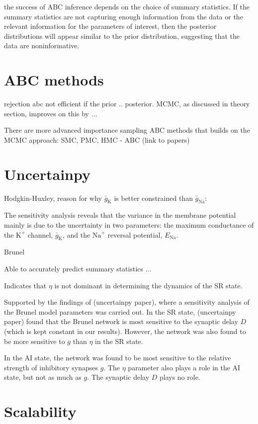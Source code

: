 the success of ABC inference depends on the choice of summary statistics. If the summary statistics are not capturing enough information from the data or the relevant information for the parameters of interest, then the posterior distributions will appear similar to the prior distribution, suggesting that the data are noninformative. 

\section{ABC methods}

rejection abc not efficient if the prior .. posterior. MCMC, as discussed in theory section, improves on this by ... 

There are more advanced importance sampling ABC methods that builds on the MCMC approach: SMC, PMC, HMC - ABC (link to papers)


\section{Uncertainpy}

Hodgkin-Huxley, reason for why $\bar{g}_\mathrm{K}$ is better constrained than $\bar{g}_\mathrm{Na}$:

The sensitivity analysis reveals that the variance in the membrane potential mainly is due to the uncertainty in two parameters: the maximum conductance of the $\mathrm{K}^+$ channel, $\bar{g}_\mathrm{K}$, and the $\mathrm{Na}^+$ reversal potential, $E_\mathrm{Na}$.

Brunel 

Able to accurately predict summary statistics ...

Indicates that $\eta$ is not dominant in determining the dynamics of the SR state. 

Supported by the findings of (uncertainpy paper), where a sensitivity analysis of the Brunel model parameters was carried out. In the SR state, (uncertainpy paper) found that the Brunel network is most sensitive to the synaptic delay $D$ (which is kept constant in our results). However, the network was also found to be more sensitive to $g$ than $\eta$ in the SR state. 

In the AI state, the network was found to be most sensitive to the relative strength of inhibitory synapses $g$. The $\eta$ parameter also plays a role in the AI state, but not as much as $g$. The synaptic delay $D$ plays no role. 

\section{Scalability}

